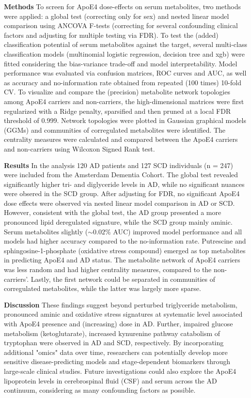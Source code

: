 \documentclass{amsart}
\begin{document}
\textbf{Methods}\hspace{.1cm} To screen for ApoE4 dose-effects on serum metabolites, two methods were applied: a global test (correcting only for sex) and nested linear model comparison using ANCOVA F-tests (correcting for several confounding clinical factors and adjusting for multiple testing via FDR). To test the (added) classification potential of serum metabolites against the target, several multi-class classification models (multinomial logistic regression, decision tree and \acrlong{xgb}) were fitted considering the bias-variance trade-off and model interpretability. Model performance was  evaluated via confusion matrices, ROC curves and AUC, as well as accuracy and no-information rate obtained from repeated (100 times) 10-fold CV. To visualize and compare the (precision) metabolite network topologies among ApoE4 carriers and non-carriers, the high-dimensional matrices were first regularized with a Ridge penalty, sparsified and then pruned at a local FDR threshold of 0.999. Network topologies were plotted in Gaussian graphical models (GGMs) and communities of corregulated metabolites were identified. The centrality measures were calculated and compared between the ApoE4 carriers and non-carriers using Wilcoxon Signed Rank test.

\textbf{Results}\hspace{.1cm} 
In the analysis 120 AD patients and 127 SCD individuals (n = 247) were included from the Amsterdam Dementia Cohort. The global test revealed significantly higher tri- and diglyceride levels in AD, while no significant nuances were obsered in the SCD group. After adjusting for FDR, no significant ApoE4 dose effects were observed via nested linear model comparison in AD or SCD. However, consistent with the global test, the AD group presented a more pronounced lipid deregulated signature, while the SCD group mainly aminic. Serum metabolites slightly ($\sim0.02\%$ AUC) improved model performance and all models had higher accuracy compared to the no-information rate. Putrescine and sphingosine-1-phosphate (oxidative stress compound) emerged as top metabolites in predicting ApoE4 and AD status. The metabolite network of ApoE4 carriers was less random and had higher centrality measures, compared to the non-carriers'. Lastly, the first network could be separated in communities of corregulated metabolites, while the latter was largely more sparse.

\textbf{Discussion}\hspace{.1cm} These findings suggest beyond perturbed triglyceride metabolism, pronounced aminic and oxidative stress signatures at systematic level associated with ApoE4 presence and (increasing) dose in AD. Further, impaired glucose metabolism (ketoglutarate), increased kynurenine pathway catabolism of tryptophan were observed in AD and SCD, respectively. By incorporating additional "omics" data over time, researchers can potentially develop more sensitive disease-predicting models and stage-dependent biomarkers through large-scale clinical studies. Future investigations could also explore the ApoE4 lipoprotein levels in cerebrospinal fluid (CSF) and serum across the AD continuum, considering as many confounding factors as possible.
\end{document}
